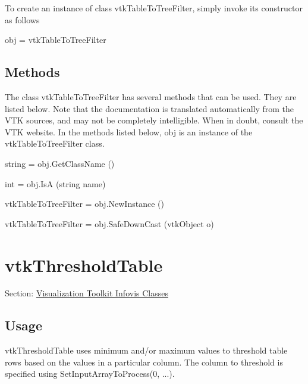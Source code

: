 To create an instance of class vtk\-Table\-To\-Tree\-Filter, simply invoke its constructor as follows \begin{DoxyVerb}  obj = vtkTableToTreeFilter
\end{DoxyVerb}
 \hypertarget{vtkwidgets_vtkxyplotwidget_Methods}{}\subsection{Methods}\label{vtkwidgets_vtkxyplotwidget_Methods}
The class vtk\-Table\-To\-Tree\-Filter has several methods that can be used. They are listed below. Note that the documentation is translated automatically from the V\-T\-K sources, and may not be completely intelligible. When in doubt, consult the V\-T\-K website. In the methods listed below, {\ttfamily obj} is an instance of the vtk\-Table\-To\-Tree\-Filter class. 
\begin{DoxyItemize}
\item {\ttfamily string = obj.\-Get\-Class\-Name ()}  
\item {\ttfamily int = obj.\-Is\-A (string name)}  
\item {\ttfamily vtk\-Table\-To\-Tree\-Filter = obj.\-New\-Instance ()}  
\item {\ttfamily vtk\-Table\-To\-Tree\-Filter = obj.\-Safe\-Down\-Cast (vtk\-Object o)}  
\end{DoxyItemize}\hypertarget{vtkinfovis_vtkthresholdtable}{}\section{vtk\-Threshold\-Table}\label{vtkinfovis_vtkthresholdtable}
Section\-: \hyperlink{sec_vtkinfovis}{Visualization Toolkit Infovis Classes} \hypertarget{vtkwidgets_vtkxyplotwidget_Usage}{}\subsection{Usage}\label{vtkwidgets_vtkxyplotwidget_Usage}
vtk\-Threshold\-Table uses minimum and/or maximum values to threshold table rows based on the values in a particular column. The column to threshold is specified using Set\-Input\-Array\-To\-Process(0, ...).

